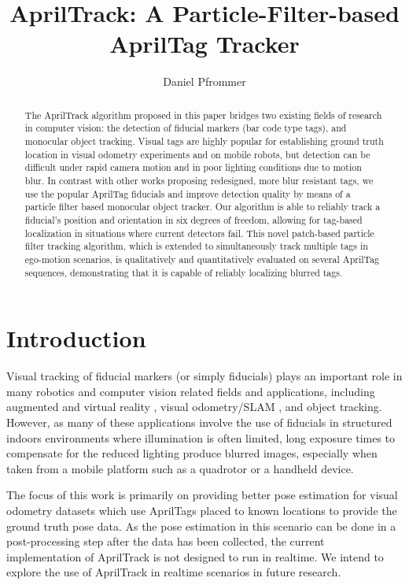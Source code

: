 \documentclass[letterpaper, 10 pt, conference]{ieeeconf}
\title{\textbf{AprilTrack: A Particle-Filter-based AprilTag Tracker}}
\author{Daniel Pfrommer}
\date{}
\begin{document}
\maketitle

\begin{abstract}

	The AprilTrack algorithm proposed in this paper bridges two existing fields of research in computer vision: the detection of fiducial markers (bar code type tags), and monocular object tracking. Visual tags are highly popular for establishing ground truth location in visual odometry experiments and on mobile robots, but detection can be difficult under rapid camera motion and in poor lighting conditions due to motion blur. In contrast with other works proposing redesigned, more blur resistant tags, we use the popular AprilTag fiducials and improve detection quality by means of a particle filter based monocular object tracker. Our algorithm is able to reliably track a fiducial's position and orientation in six degrees of freedom, allowing for tag-based localization in situations where current detectors fail. This novel patch-based particle filter tracking algorithm, which is extended to simultaneously track multiple tags in ego-motion scenarios, is qualitatively and quantitatively evaluated on several AprilTag sequences, demonstrating that it is capable of reliably localizing blurred tags.
		
\end{abstract}

\section{Introduction}


Visual tracking of fiducial markers (or simply fiducials) plays an important role in many robotics and computer vision related fields and applications, including augmented and virtual reality \citep{AugmentedReality}, visual odometry/SLAM \citep{TagSLAM}, and object tracking. However, as many of these applications involve the use of fiducials in structured indoors environments where illumination is often limited, long exposure times to compensate for the reduced lighting produce blurred images, especially when taken from a mobile platform such as a quadrotor or a handheld device.

The focus of this work is primarily on providing better pose estimation for visual odometry datasets which use AprilTags placed to known locations to provide the ground truth pose data. As the pose estimation in this scenario can be done in a post-processing step after the data has been collected, the current implementation of AprilTrack is not designed to run in realtime. We intend to explore the use of AprilTrack in realtime scenarios in future research.
\end{document}

